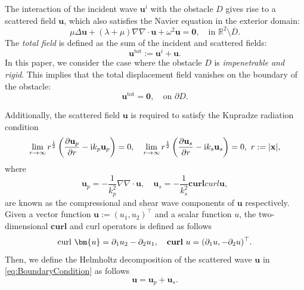 \documentclass[11pt,reqno,twoside]{amsart}
\theoremstyle{definition}
\theoremstyle{remark}
\numberwithin{equation}{section}
\newcommand{\bmf}[1]{{\mathbf{#1}}}
\begin{document}
The interaction of the incident wave \( \bmf{u}^i \) with the obstacle \( D \) gives rise to a scattered field \( \bmf{u} \), which also satisfies the Navier equation in the exterior domain:
\begin{equation}\label{eq:syst1}
	\mu \Delta \bmf{u} + (\lambda + \mu) \nabla \nabla \cdot \bmf{u} + \omega^2 \bmf{u} = \bmf{0}, \quad \text{in } \mathbb{R}^2 \setminus \overline{D}.
\end{equation}
The \emph{total field} is defined as the sum of the incident and scattered fields:
\[
\bmf{u}^{\mathrm{tot}} := \bmf{u}^i + \bmf{u}.
\]
In this paper, we consider the case where the obstacle \( D \) is \emph{impenetrable and rigid}. This implies that the total displacement field vanishes on the boundary of the obstacle:
\begin{equation}\label{eq:BoundaryCondition}
	\bmf{u}^{\mathrm{tot}} = \bmf{0}, \quad \text{on } \partial D.
\end{equation}



	
	
	Additionally, the scattered field $\mathbf u$ is required to satisfy the Kupradze radiation condition
	\begin{equation}\label{eq:RadiationCondition}
		\lim_{r\to\infty}r^\frac{1}{2}\left(\frac{\partial\bmf{u}_p}{\partial r}-{\rm i}k_p\bmf{u}_p\right)=0, \quad   	\lim_{r\to\infty}r^\frac{1}{2}\left(\frac{\partial\bmf{u}_s}{\partial r}-{\rm i}k_s\bmf{u}_s\right)=0, \ r:=|\bmf{x}|,
	\end{equation}
	where 
	$$
	\bmf{u}_p=-\frac{1}{k_p^2}\nabla \nabla \cdot \mathbf u,\quad \bmf{u}_s=-\frac{1}{k_s^2}\mathbf{curl}curl\mathbf u,
	$$
	are known as the compressional and shear wave components of $\mathbf u$ respectively.
	Given a vector function $\mathbf u:= \left( u_1, u_2\right)^{\top} $ and a scalar function $u$, the two-dimensional $\mathbf{curl}$ and curl operators is defined as follows
	\begin{equation}\label{eq:curl}
		{\rm curl}~ \bm{u}=\partial_1u_2-\partial_2u_1, \quad {\bf curl}~{u} =(\partial_1 u,-\partial_2 u)^\top.
	\end{equation}
	Then, we define the Helmholtz decomposition of the scattered wave $\bmf{u}$ in \eqref{eq:BoundaryCondition} as follows
	$$
	\bmf {u}=\bmf{u}_p+\bmf{u}_s.
	$$ 
	
\end{document}
